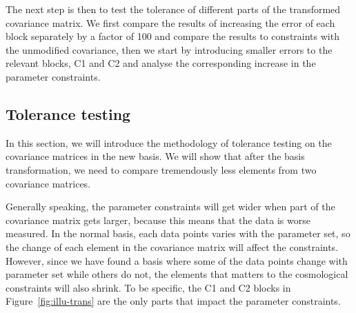 \documentclass[twocolumn]{\docclass}
\newcommand{\rf}[1]{\ref{fig:#1}}
\begin{document}
	
	
	The next step is then to test the tolerance of different parts of the transformed covariance matrix. We first compare the results of increasing the error of each block separately by a factor of 100 and compare the results to constraints with the unmodified covariance, then we start by introducing smaller errors to the relevant blocks, C1 and C2 and analyse the corresponding increase in the parameter constraints.
	
	\subsection{Tolerance testing}
	
	
	In this section, we will introduce the methodology of tolerance testing on the covariance matrices in the new basis. We will show that after the basis transformation, we need to compare tremendously less elements from two covariance matrices.
	
	Generally speaking, the parameter constraints will get wider when part of the covariance matrix gets larger, because this means that the data is worse measured. In the normal basis, each data points varies with the parameter set, so the change of each element in the covariance matrix will affect the constraints. However, since we have found a basis where some of the data points change with parameter set while others do not, the elements that matters to the cosmological constraints will also shrink. To be specific, the C1 and C2 blocks in Figure~\rf{illu-trans} are the only parts that impact the parameter constraints. 
	
\end{document}
